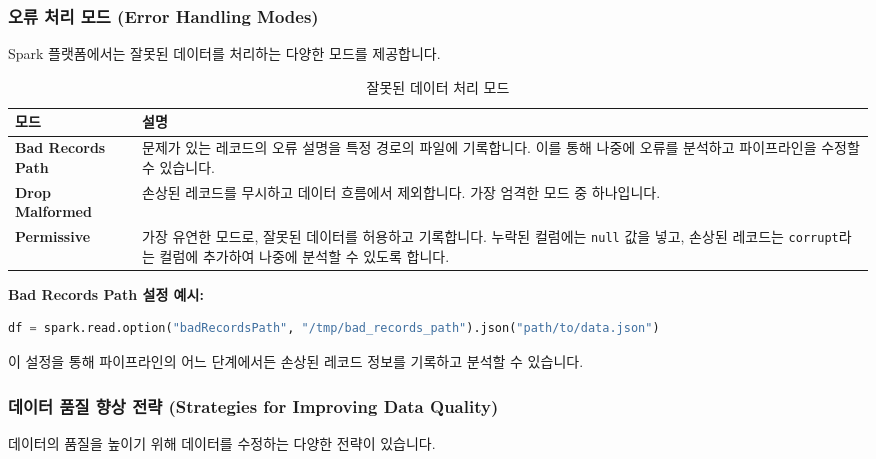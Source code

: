 \documentclass[11pt,a4paper]{article}
\theoremstyle{definition}
\begin{document}
\begin{enumerate}
\subsubsection{오류 처리 모드 (Error Handling Modes)}
Spark 플랫폼에서는 잘못된 데이터를 처리하는 다양한 모드를 제공합니다.

\begin{table}[h!]
\centering
\caption{잘못된 데이터 처리 모드}
\label{tab:error_handling_modes}
\begin{adjustbox}{width=\textwidth, center}
\begin{tabular}{p{}p{}}
\toprule
\textbf{모드} & \textbf{설명} \\
\midrule
\textbf{Bad Records Path} & 문제가 있는 레코드의 오류 설명을 특정 경로의 파일에 기록합니다. 이를 통해 나중에 오류를 분석하고 파이프라인을 수정할 수 있습니다. \\
\textbf{Drop Malformed} & 손상된 레코드를 무시하고 데이터 흐름에서 제외합니다. 가장 엄격한 모드 중 하나입니다. \\
\textbf{Permissive} & 가장 유연한 모드로, 잘못된 데이터를 허용하고 기록합니다. 누락된 컬럼에는 \texttt{null} 값을 넣고, 손상된 레코드는 \texttt{corrupt}라는 컬럼에 추가하여 나중에 분석할 수 있도록 합니다. \\
\bottomrule
\end{tabular}
\end{adjustbox}
\end{table}

\begin{examplebox}
\textbf{Bad Records Path 설정 예시:}
\begin{lstlisting}[language=python, caption={Bad Records Path 설정 예시}, label={lst:bad_records_path}]
df = spark.read.option("badRecordsPath", "/tmp/bad_records_path").json("path/to/data.json")
\end{lstlisting}
이 설정을 통해 파이프라인의 어느 단계에서든 손상된 레코드 정보를 기록하고 분석할 수 있습니다.
\end{examplebox}

\subsubsection{데이터 품질 향상 전략 (Strategies for Improving Data Quality)}
데이터의 품질을 높이기 위해 데이터를 수정하는 다양한 전략이 있습니다.


\end{enumerate}
\end{document}
